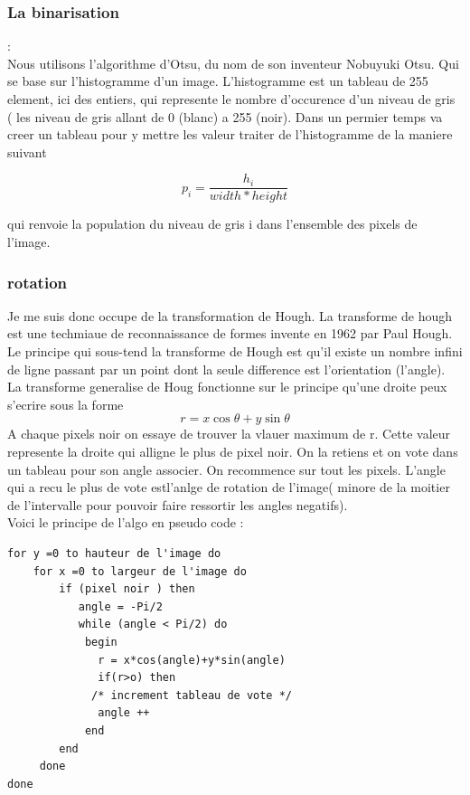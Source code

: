 \documentclass{article}
\begin{document}
\subsubsection{La binarisation}
:\\
Nous utilisons l'algorithme d'Otsu, du nom de son inventeur Nobuyuki Otsu. Qui se base sur l'histogramme d'un image. L'histogramme est un tableau de 255 element, ici des entiers, qui represente le nombre d'occurence d'un niveau de gris ( les niveau de gris allant de 0 (blanc) a 255 (noir). Dans un permier temps va creer un tableau pour y mettre les valeur traiter de l'histogramme de la maniere suivant 
\begin{center}
\[ p_{i} = \frac{h_{i}} {width * height}\]
\end{center}
qui renvoie la population du niveau de gris i dans l'ensemble des pixels de l'image.
\subsubsection{rotation}
Je me suis donc occupe de la transformation de Hough. La transforme de hough est une techmiaue de reconnaissance de formes invente en 1962 par Paul Hough.
Le principe qui sous-tend la transforme de Hough est qu'il existe un nombre infini de ligne passant par un point dont la seule difference est l'orientation (l'angle). La transforme generalise de Houg fonctionne sur le principe qu'une droite peux s'ecrire sous la forme 
\[r = x\cos{\theta}+y\sin{\theta}\]
A chaque pixels noir on essaye de trouver la vlauer maximum de r. Cette valeur represente la droite qui alligne le plus de pixel noir. On la retiens et on vote dans un tableau pour son angle associer. On recommence sur tout les pixels. L'angle qui a recu le plus de vote estl'anlge de rotation de l'image( minore de la moitier de l'intervalle pour pouvoir faire ressortir les angles negatifs).
\\
Voici le principe de l'algo en pseudo code :
\begin{lstlisting}
for y =0 to hauteur de l'image do
    for x =0 to largeur de l'image do
        if (pixel noir ) then
           angle = -Pi/2
           while (angle < Pi/2) do
            begin
              r = x*cos(angle)+y*sin(angle)
              if(r>o) then
             /* increment tableau de vote */          
              angle ++
            end
        end
     done
done

\end{lstlisting} 
\end{document}
